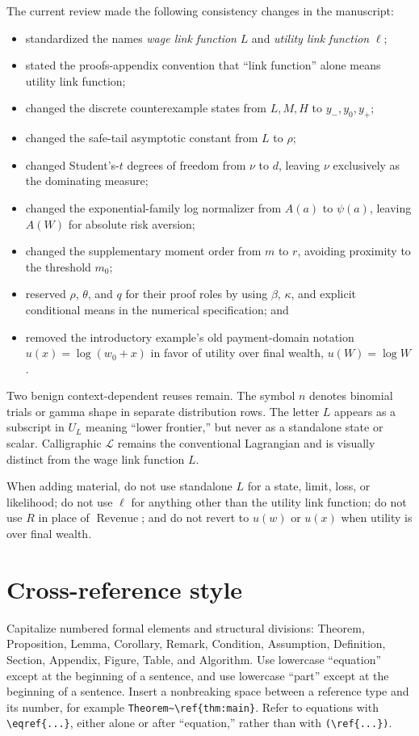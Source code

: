 \documentclass[11pt]{article}
\newcommand{\Revenue}{\operatorname{Revenue}}
\begin{document}
The current review made the following consistency changes in the manuscript:
\begin{itemize}
    \item standardized the names \emph{wage link function} $L$ and
    \emph{utility link function} $\ell$;
    \item stated the proofs-appendix convention that ``link function'' alone
    means utility link function;
    \item changed the discrete counterexample states from $L,M,H$ to
    $y_-,y_0,y_+$;
    \item changed the safe-tail asymptotic constant from $L$ to $\rho$;
    \item changed Student's-$t$ degrees of freedom from $\nu$ to $d$, leaving
    $\nu$ exclusively as the dominating measure;
    \item changed the exponential-family log normalizer from $A(a)$ to
    $\psi(a)$, leaving $A(W)$ for absolute risk aversion;
    \item changed the supplementary moment order from $m$ to $r$, avoiding
    proximity to the threshold $m_0$;
    \item reserved $\rho$, $\theta$, and $q$ for their proof roles by using
    $\beta$, $\kappa$, and explicit conditional means in the numerical
    specification; and
    \item removed the introductory example's old payment-domain notation
    $u(x)=\log(w_0+x)$ in favor of utility over final wealth, $u(W)=\log W$.
\end{itemize}

Two benign context-dependent reuses remain.  The symbol $n$ denotes binomial
trials or gamma shape in separate distribution rows.  The letter $L$ appears as
a subscript in $U_L$ meaning ``lower frontier,'' but never as a standalone
state or scalar.  Calligraphic $\mathcal L$ remains the conventional
Lagrangian and is visually distinct from the wage link function $L$.

When adding material, do not use standalone $L$ for a state, limit, loss, or
likelihood; do not use $\ell$ for anything other than the utility link function;
do not use $R$ in place of $\Revenue$; and do not revert to $u(w)$ or $u(x)$
when utility is over final wealth.

\section{Cross-reference style}

Capitalize numbered formal elements and structural divisions: Theorem,
Proposition, Lemma, Corollary, Remark, Condition, Assumption, Definition,
Section, Appendix, Figure, Table, and Algorithm.  Use lowercase
``equation'' except at the beginning of a sentence, and use lowercase
``part'' except at the beginning of a sentence.  Insert a nonbreaking space
between a reference type and its number, for example
\verb|Theorem~\ref{thm:main}|.  Refer to equations with \verb|\eqref{...}|,
either alone or after ``equation,'' rather than with \verb|(\ref{...})|.
\end{document}
